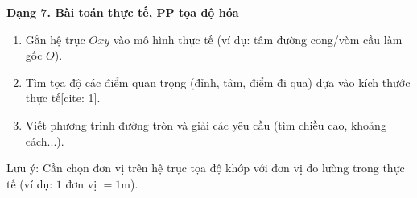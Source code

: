\textbf{Dạng 7. Bài toán thực tế, PP tọa độ hóa}
\begin{enumerate}
\item Gắn hệ trục $Oxy$ vào mô hình thực tế (ví dụ: tâm đường cong/vòm cầu làm gốc $O$).
\item Tìm tọa độ các điểm quan trọng (đỉnh, tâm, điểm đi qua) dựa vào kích thước thực tế[cite: 1].
\item Viết phương trình đường tròn và giải các yêu cầu (tìm chiều cao, khoảng cách...).
\end{enumerate}
Lưu ý: Cần chọn đơn vị trên hệ trục tọa độ khớp với đơn vị đo lường trong thực tế (ví dụ: $1$ đơn vị $= 1\text{m}$).
